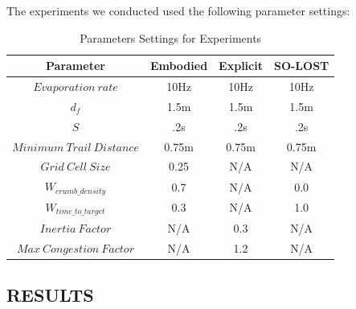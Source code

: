 \documentclass[letterpaper, 10 pt, conference]{ieeeconf}  %
\begin{document}
The experiments we conducted used the following parameter settings:

\begin{table}[ht]                                                              
  \begin{center}
    \begin{tabular}{|c|c|c|c|}                                                
    \hline
      Parameter & Embodied & Explicit & SO-LOST\\                                  
    \hline                                                                    
      $Evaporation\ rate$ & 10Hz & 10Hz & 10Hz\\ %
    \hline
      $d_f$ & 1.5m & 1.5m & 1.5m\\ %
    \hline
      $S$ & .2s & .2s & .2s\\ %
    \hline
      $Minimum\ Trail\ Distance$ & 0.75m & 0.75m & 0.75m\\ %
    \hline
      $Grid\ Cell\ Size$ & 0.25 & N/A & N/A\\ %
    \hline
      $W_{crumb\_density}$ & 0.7 & N/A & 0.0\\ %
    \hline
      $W_{time\_to\_target}$ & 0.3 & N/A & 1.0\\ %
    \hline
      $Inertia\ Factor$ & N/A & 0.3 & N/A\\ %
    \hline
      $Max\ Congestion\ Factor$ & N/A & 1.2 & N/A\\ %
    \hline
    \end{tabular}
   \caption{Parameters Settings for Experiments}                                
    \label{table:parameter_settings}
  \end{center}
\end{table}

\subsection{RESULTS}
\end{document}
